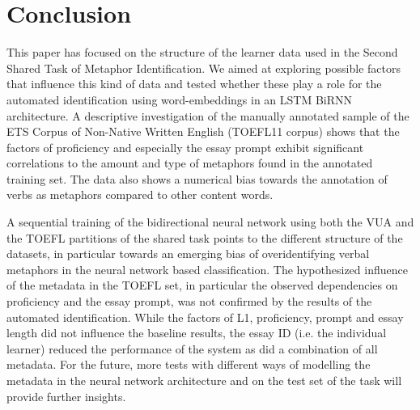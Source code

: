 \documentclass[11pt,a4paper]{article}
\begin{document}






\section{Conclusion}

This paper has focused on the structure of the learner data used in the Second Shared Task of Metaphor Identification. We aimed at exploring possible factors that influence this kind of data and tested whether these play a role for the automated identification using word-embeddings in an LSTM BiRNN architecture. A descriptive investigation of the manually annotated sample of the ETS Corpus of Non-Native Written English (TOEFL11 corpus) shows that the factors of proficiency and especially the essay prompt exhibit significant correlations to the amount and type of metaphors found in the annotated training set. The data also shows a numerical bias towards the annotation of verbs as metaphors compared to other content words.

 A sequential training of the bidirectional neural network using both the VUA and the TOEFL partitions of the shared task points to the different structure of the datasets, in particular towards an emerging bias of overidentifying verbal metaphors in the neural network based classification. The hypothesized influence of the metadata in the TOEFL set, in particular the observed dependencies on proficiency and the essay prompt, was not confirmed by the results of the automated identification. While the factors of L1, proficiency, prompt and essay length did not influence the baseline results, the essay ID (i.e. the individual learner) reduced the performance of the system as did a combination of all metadata. For the future, more tests with different ways of modelling the metadata in the neural network architecture and on the test set of the task will provide further insights.
\end{document}
